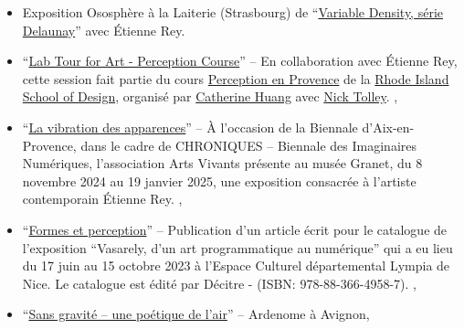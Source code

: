 \documentclass[10pt,french,a4paper,oneside]{article}%
\newcommand{\years}[1]{\marginpar{\textit{\scriptsize #1}}}
\begin{document}
\begin{itemize}
	\item Exposition Ososphère à la Laiterie (Strasbourg) de ``\href{https://laurentperrinet.github.io/post/2026-02-20_ososphere/}{Variable Density, série Delaunay}'' avec Étienne Rey.
	
	\item ``\href{https://laurentperrinet.github.io/talk/2026-01-19-art-and-science}{Lab Tour for Art - Perception Course}'' – En collaboration avec Étienne Rey, cette session fait partie du cours \href{https://www.risd.edu/academics/illustration/courses}{Perception en Provence} de la \href{https://www.risd.edu}{Rhode Island School of Design}, organisé par \href{https://www.instagram.com/cathuangart/}{Catherine Huang} avec \href{https://www.linkedin.com/in/ntolley/}{Nick Tolley}.	\years{2026},

	\item ``\href{https://laurentperrinet.github.io/post/2024-11-07_vibration-apparences/}{La vibration des apparences}'' – À l’occasion de la Biennale d’Aix-en-Provence, dans le cadre de CHRONIQUES – Biennale des Imaginaires Numériques, l’association Arts Vivants présente au musée Granet, du 8 novembre 2024 au 19 janvier 2025, une exposition consacrée à l’artiste contemporain Étienne Rey. \years{2024},
	
	\item ``\href{https://laurentperrinet.github.io/publication/perrinet-23-formes-et-perception/}{Formes et perception}'' – Publication d’un article écrit pour le catalogue de l’exposition “Vasarely, d’un art programmatique au numérique” qui a eu lieu du 17 juin au 15 octobre 2023 à l’Espace Culturel départemental Lympia de Nice. Le catalogue est édité par Décitre - (ISBN: 978-88-366-4958-7). \years{2023},
	
	\item ``\href{https://laurentperrinet.github.io/post/2019-06-22_ardemone/}{Sans gravité – une poétique de l’air}'' – Ardenome à Avignon\years{2019},
	

\end{itemize}
\end{document}
